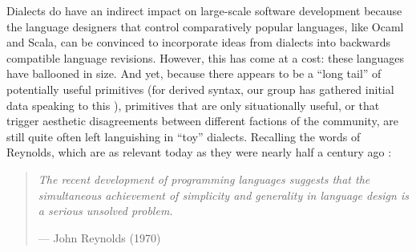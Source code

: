 Dialects do have an indirect impact on large-scale software development because the language designers that control comparatively popular languages, like Ocaml and Scala, can be convinced to incorporate  ideas from dialects  into backwards compatible language revisions. %
However, this  has come at a cost: these languages have ballooned in size. And yet, because there appears to be a ``long tail'' of potentially useful primitives (for derived syntax, our group has  gathered initial data speaking to this \cite{TSLs}),  primitives that are only situationally useful, or that trigger aesthetic disagreements between different factions of the community, are still quite often left languishing in ``toy'' dialects. 
Recalling the words of  Reynolds, which are as relevant today as they were nearly half a century ago \cite{Reynolds70}:%
  
\begin{quote}\textit{The recent development of programming languages suggests that the simul\-taneous achievement of simplicity 
and generality in language design is a serious unsolved 
problem.}\begin{flushright}--- John Reynolds (1970)\end{flushright}
\end{quote}


